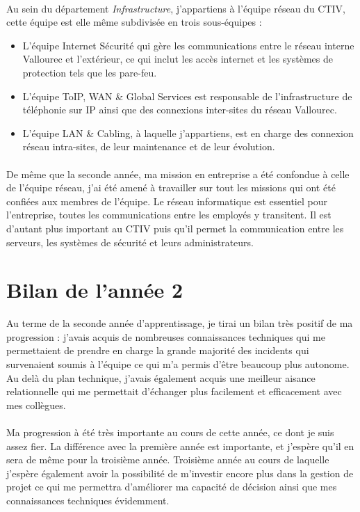 \documentclass[a4paper,12pt]{report}
\begin{document}
\paragraph{}
Au sein du département \textit{Infrastructure}, j'appartiens à l'équipe réseau du CTIV, cette équipe est elle même subdivisée en trois sous-équipes :
\begin{itemize}
\item L'équipe Internet Sécurité qui gère les communications entre le réseau interne Vallourec et l'extérieur, ce qui inclut les accès internet et les systèmes de protection tels que les pare-feu.
\item L'équipe ToIP, WAN \& Global Services est responsable de l'infrastructure de téléphonie sur IP ainsi que des connexions inter-sites du réseau Vallourec.
\item L'équipe LAN \& Cabling, à laquelle j'appartiens, est en charge des connexion réseau intra-sites, de leur maintenance et de leur évolution.
\end{itemize}

\paragraph{}
De même que la seconde année, ma mission en entreprise a été confondue à celle de l'équipe réseau, j'ai été amené à travailler sur tout les missions qui ont été confiées aux membres de l'équipe. Le réseau informatique est essentiel pour l'entreprise, toutes les communications entre les employés y transitent. Il est d'autant plus important au CTIV puis qu'il permet la communication entre les serveurs, les systèmes de sécurité et leurs administrateurs.

\section{Bilan de l'année 2}
Au terme de la seconde année d'apprentissage, je tirai un bilan très positif de ma progression : j'avais acquis de nombreuses connaissances techniques qui me permettaient de prendre en charge la grande majorité des incidents qui survenaient soumis à l'équipe ce qui m'a permis d'être beaucoup plus autonome. Au delà du plan technique, j'avais également acquis une meilleur aisance relationnelle qui me permettait d'échanger plus facilement et efficacement avec mes collègues.

\paragraph{}
Ma progression à été très importante au cours de cette année, ce dont je suis assez fier. La différence avec la première année est importante, et j'espère qu'il en sera de même pour la troisième année. Troisième année au cours de laquelle j'espère également avoir la possibilité de m'investir encore plus dans la gestion de projet ce qui me permettra d'améliorer ma capacité de décision ainsi que mes connaissances techniques évidemment.
\end{document}
